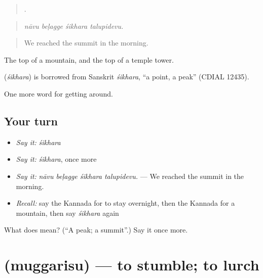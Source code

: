 \begin{quote}
   .
\end{quote}

\begin{quote}
\emph{nāvu beḷagge śikhara talupidevu.}
\end{quote}

\begin{quote}
We reached the summit in the morning.
\end{quote}

The top of a mountain, and the top of a temple tower.

\begin{cousinweb}
\textbf{} (\emph{śikhara}) is borrowed from Sanskrit \emph{śikhara}, \textquotedblleft{}a point, a peak\textquotedblright{} (CDIAL 12435).
\end{cousinweb}

\begin{grammarlens}[title={What you've built}]
One more word for getting around.
\end{grammarlens}

\subsection*{Your turn}
\begin{itemize}
\raggedright
  \item \emph{Say it:} \emph{śikhara}
  \item \emph{Say it:} \emph{śikhara}, once more
  \item \emph{Say it:} \emph{nāvu beḷagge śikhara talupidevu.} — We reached the summit in the morning.
  \item \emph{Recall:} say the Kannada for to stay overnight, then the Kannada for a mountain, then say \emph{śikhara} again
\end{itemize}

\begin{tcolorbox}[breakable,colback=teal!4,colframe=teal!35!black,title={Before you move on}]
What does  mean? (\textquotedblleft{}A peak; a summit\textquotedblright{}.) Say it once more.
\end{tcolorbox}
\section[\texorpdfstring{\kn{ಮುಗ್ಗರಿಸು} (muggarisu)}{ಮುಗ್ಗರಿಸು (muggarisu)}]{ (muggarisu) — to stumble; to lurch}

